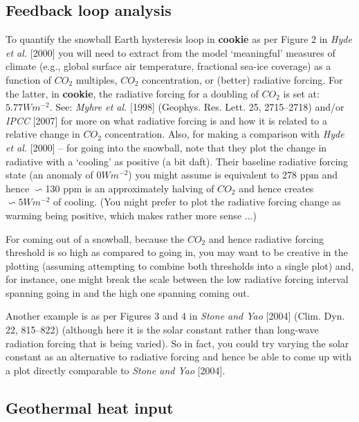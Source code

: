 \subsection{Feedback loop analysis}

To quantify the snowball Earth hysteresis loop in \textbf{cookie} as per Figure 2 in \textit{Hyde et al.} [2000] you will need to extract from the model ‘meaningful’ measures of climate (e.g., global surface air temperature, fractional sea-ice coverage) as a function of \(CO_{2}\) multiples, \(CO_{2}\) concentration, or (better) radiative forcing. For the latter, in \textbf{cookie}, the radiative forcing for a doubling of \(CO_{2}\) is set at: \(5.77 Wm^{-2}\). See: \textit{Myhre et al.} [1998] (Geophys. Res. Lett. 25, 2715–2718) and/or \textit{IPCC} [2007] for more on what radiative forcing is and how it is related to a relative change in \(CO_{2}\) concentration. Also, for making a comparison with \textit{Hyde et al.} [2000] -- for going into the snowball, note that they plot the change in radiative with a ‘cooling’ as positive (a bit daft). Their baseline radiative forcing state (an anomaly of \(0 Wm^{-2}\)) you might assume is equivalent to 278 ppm and hence \(\backsim\)130 ppm is an approximately halving of \(CO_{2}\) and hence creates \(\backsim5 Wm^{-2}\) of cooling. (You might prefer to plot the radiative forcing change as warming being positive, which makes rather more sense ...)

For coming out of a snowball, because the \(CO_{2}\) and hence radiative forcing threshold is so high as compared to going in, you may want to be creative in the plotting (assuming attempting to combine both thresholds into a single plot) and, for instance, one might break the scale between the low radiative forcing interval spanning going in and the high one spanning coming out.

Another example is as per Figures 3 and 4 in \textit{Stone and Yao} [2004] (Clim. Dyn. 22, 815–822) (although here it is the solar constant rather than long-wave radiation forcing that is being varied). So in fact, you could try varying the solar constant as an alternative to radiative forcing and hence be able to come up with a plot directly comparable to \textit{Stone and Yao} [2004].


\subsection{Geothermal heat input}

